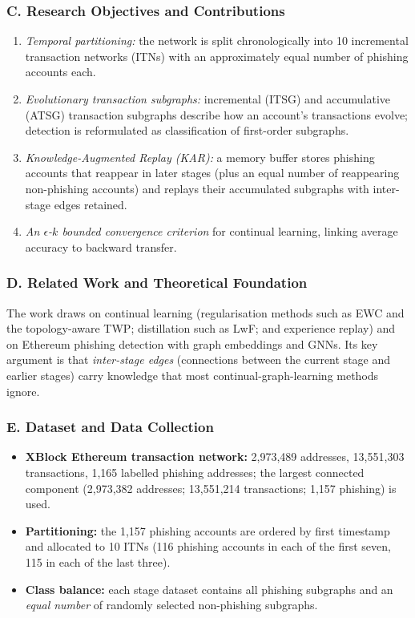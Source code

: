 \documentclass[11pt,a4paper]{article}
\begin{document}
\subsubsection*{C. Research Objectives and Contributions}
\begin{enumerate}[leftmargin=*]
    \item \textit{Temporal partitioning:} the network is split chronologically into 10 incremental transaction networks (ITNs) with an approximately equal number of phishing accounts each.
    \item \textit{Evolutionary transaction subgraphs:} incremental (ITSG) and accumulative (ATSG) transaction subgraphs describe how an account's transactions evolve; detection is reformulated as classification of first-order subgraphs.
    \item \textit{Knowledge-Augmented Replay (KAR):} a memory buffer stores phishing accounts that reappear in later stages (plus an equal number of reappearing non-phishing accounts) and replays their accumulated subgraphs with inter-stage edges retained.
    \item \textit{An $\epsilon$-$k$ bounded convergence criterion} for continual learning, linking average accuracy to backward transfer.
\end{enumerate}

\subsubsection*{D. Related Work and Theoretical Foundation}
The work draws on continual learning (regularisation methods such as EWC and the topology-aware TWP; distillation such as LwF; and experience replay) and on Ethereum phishing detection with graph embeddings and GNNs. Its key argument is that \emph{inter-stage edges} (connections between the current stage and earlier stages) carry knowledge that most continual-graph-learning methods ignore.

\subsubsection*{E. Dataset and Data Collection}
\begin{itemize}[leftmargin=*]
    \item \textbf{XBlock Ethereum transaction network:} 2,973,489 addresses, 13,551,303 transactions, 1,165 labelled phishing addresses; the largest connected component (2,973,382 addresses; 13,551,214 transactions; 1,157 phishing) is used.
    \item \textbf{Partitioning:} the 1,157 phishing accounts are ordered by first timestamp and allocated to 10 ITNs (116 phishing accounts in each of the first seven, 115 in each of the last three).
    \item \textbf{Class balance:} each stage dataset contains all phishing subgraphs and an \emph{equal number} of randomly selected non-phishing subgraphs.
\end{itemize}
\end{document}
